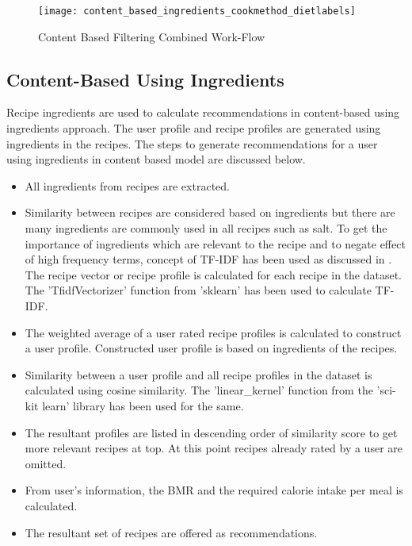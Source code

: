\begin{singlespace}
\begin{figure}[H]
	\centering
	\texttt{[image: content\_based\_ingredients\_cookmethod\_dietlabels]}
	\caption{Content Based Filtering Combined Work-Flow }
	\label{fig:content_based_ingredients_cookmethod_dietlabels}
\end{figure}  
\end{singlespace}


\subsection{Content-Based Using Ingredients}
\label{sec:cb_ingredients}
Recipe ingredients are used to calculate recommendations in content-based using ingredients approach. The user profile and recipe profiles are generated using ingredients in the recipes. The steps to generate recommendations for a user using ingredients in content based model are discussed below.
\begin{itemize}
\item All ingredients from recipes are extracted. 
\item Similarity between recipes are considered based on ingredients but there are many ingredients are commonly used in all recipes such as salt. To get the importance of ingredients which are relevant to the recipe and to negate effect of high frequency terms, concept of TF-IDF has been used as discussed in . The recipe vector or recipe profile is calculated for each recipe in the dataset. The 'TfidfVectorizer' function from 'sklearn' has been used to calculate TF-IDF.
\item The weighted average of a user rated recipe profiles is calculated to construct a user profile. Constructed user profile is based on ingredients of the recipes.  
\item Similarity between a user profile and all recipe profiles in the dataset is calculated using cosine similarity. The 'linear\_kernel' function from the 'sci-kit learn' library has been used for the same. 
\item The resultant profiles are listed in descending order of similarity score to get more relevant recipes at top. At this point recipes already rated by a user are omitted. 
\item From user's information, the BMR and the required calorie intake per meal is calculated. 
\item The resultant set of recipes are offered as recommendations. 
\end{itemize}
